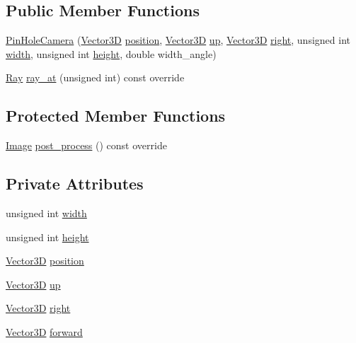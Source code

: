 \subsection*{Public Member Functions}
\begin{DoxyCompactItemize}
\item 
\hyperlink{classcamera_1_1PinHoleCamera_a0d7c74abd23ababb8e244fade0443f15}{Pin\+Hole\+Camera} (\hyperlink{classVector3D}{Vector3D} \hyperlink{classcamera_1_1PinHoleCamera_a1da1c0a5fd23a13becf47e5701ac63d6}{position}, \hyperlink{classVector3D}{Vector3D} \hyperlink{classcamera_1_1PinHoleCamera_ae0cbcdd56cd87fe2b90a2934ff1d37a8}{up}, \hyperlink{classVector3D}{Vector3D} \hyperlink{classcamera_1_1PinHoleCamera_a5c2502b1ff78c2e25c5e75cc02b91918}{right}, unsigned int \hyperlink{classcamera_1_1PinHoleCamera_a84af11864219ddf7d2e3ddb0a7888d56}{width}, unsigned int \hyperlink{classcamera_1_1PinHoleCamera_a2a2e02ab02a6dcb59b0de224f7c629ba}{height}, double width\+\_\+angle)
\item 
\hyperlink{classRay}{Ray} \hyperlink{classcamera_1_1PinHoleCamera_ab2457caa55561521cab10490e67ba8c8}{ray\+\_\+at} (unsigned int) const override
\end{DoxyCompactItemize}
\subsection*{Protected Member Functions}
\begin{DoxyCompactItemize}
\item 
\hyperlink{namespacecamera_a67b7fb3d5582463a057ed122bf739b7d}{Image} \hyperlink{classcamera_1_1PinHoleCamera_a1ed550429343036f2dd14a0aacbe2c27}{post\+\_\+process} () const override
\end{DoxyCompactItemize}
\subsection*{Private Attributes}
\begin{DoxyCompactItemize}
\item 
unsigned int \hyperlink{classcamera_1_1PinHoleCamera_a84af11864219ddf7d2e3ddb0a7888d56}{width}
\item 
unsigned int \hyperlink{classcamera_1_1PinHoleCamera_a2a2e02ab02a6dcb59b0de224f7c629ba}{height}
\item 
\hyperlink{classVector3D}{Vector3D} \hyperlink{classcamera_1_1PinHoleCamera_a1da1c0a5fd23a13becf47e5701ac63d6}{position}
\item 
\hyperlink{classVector3D}{Vector3D} \hyperlink{classcamera_1_1PinHoleCamera_ae0cbcdd56cd87fe2b90a2934ff1d37a8}{up}
\item 
\hyperlink{classVector3D}{Vector3D} \hyperlink{classcamera_1_1PinHoleCamera_a5c2502b1ff78c2e25c5e75cc02b91918}{right}
\item 
\hyperlink{classVector3D}{Vector3D} \hyperlink{classcamera_1_1PinHoleCamera_a2db605d2a78469feeda2cff0f01369c8}{forward}
\end{DoxyCompactItemize}
